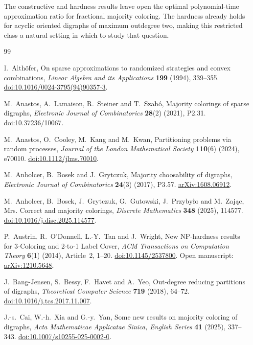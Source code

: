 \documentclass[10pt,a4paper]{article}
\begin{document}
The constructive and hardness results leave open the optimal
polynomial-time approximation ratio for fractional majority
coloring. The hardness already holds for acyclic oriented digraphs
of maximum outdegree two, making this restricted class a natural
setting in which to study that question.

\begin{thebibliography}{99}
\small
\raggedright
{}
I.~Alth\"ofer,
On sparse approximations to randomized strategies and convex combinations,
\emph{Linear Algebra and its Applications} \textbf{199} (1994), 339--355.
\href{https://doi.org/10.1016/0024-3795(94)90357-3}{doi:10.1016/0024-3795(94)90357-3}.

M.~Anastos, A.~Lamaison, R.~Steiner and T.~Szab\'o,
Majority colorings of sparse digraphs,
\emph{Electronic Journal of Combinatorics} \textbf{28}(2) (2021), P2.31.
\href{https://doi.org/10.37236/10067}{doi:10.37236/10067}.

M.~Anastos, O.~Cooley, M.~Kang and M.~Kwan,
Partitioning problems via random processes,
\emph{Journal of the London Mathematical Society} \textbf{110}(6) (2024), e70010.
\href{https://doi.org/10.1112/jlms.70010}{doi:10.1112/jlms.70010}.

M.~Anholcer, B.~Bosek and J.~Grytczuk,
Majority choosability of digraphs,
\emph{Electronic Journal of Combinatorics} \textbf{24}(3) (2017), P3.57.
\href{https://arxiv.org/abs/1608.06912}{arXiv:1608.06912}.

M.~Anholcer, B.~Bosek, J.~Grytczuk, G.~Gutowski, J.~Przyby\l o and M.~Zaj\k ac,
Mrs. Correct and majority colorings,
\emph{Discrete Mathematics} \textbf{348} (2025), 114577.
\href{https://doi.org/10.1016/j.disc.2025.114577}{doi:10.1016/j.disc.2025.114577}.

P.~Austrin, R.~O'Donnell, L.-Y.~Tan and J.~Wright,
New NP-hardness results for 3-Coloring and 2-to-1 Label Cover,
\emph{ACM Transactions on Computation Theory} \textbf{6}(1) (2014), Article~2, 1--20.
\href{https://doi.org/10.1145/2537800}{doi:10.1145/2537800}.
Open manuscript: \href{https://arxiv.org/abs/1210.5648}{arXiv:1210.5648}.

J.~Bang-Jensen, S.~Bessy, F.~Havet and A.~Yeo,
Out-degree reducing partitions of digraphs,
\emph{Theoretical Computer Science} \textbf{719} (2018), 64--72.
\href{https://doi.org/10.1016/j.tcs.2017.11.007}{doi:10.1016/j.tcs.2017.11.007}.

J.-s.~Cai, W.-h.~Xia and G.-y.~Yan,
Some new results on majority coloring of digraphs,
\emph{Acta Mathematicae Applicatae Sinica, English Series}
\textbf{41} (2025), 337--343.
\href{https://doi.org/10.1007/s10255-025-0002-0}{doi:10.1007/s10255-025-0002-0}.


\end{thebibliography}
\end{document}
